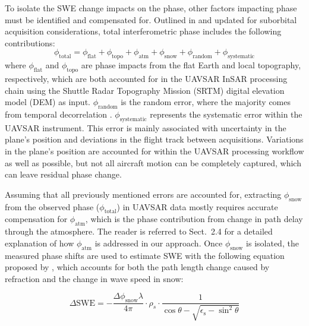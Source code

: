 To isolate the SWE change impacts on the phase, other factors impacting phase must be identified and compensated for. Outlined in \citet{deebMonitoringSnowpackEvolution2011} and updated for suborbital acquisition considerations, total interferometric phase includes the following contributions:
\begin{equation}
\phi_\mathrm{total} =  \phi_\mathrm{flat} + \phi_\mathrm{topo} + \phi_\mathrm{atm} + \phi_{\mathrm{snow}} + \phi_\mathrm{random} +\phi_\mathrm{systematic}
\end{equation}
where $\phi_\mathrm{flat}$ and $\phi_\mathrm{topo}$ are phase impacts from the flat Earth and local topography, respectively, which are both accounted for in the UAVSAR InSAR processing chain using the Shuttle Radar Topography Mission (SRTM) digital elevation model (DEM) as input. $\phi_\mathrm{random}$ is the random error, where the majority comes from temporal decorrelation \citep{zebkerAtmosphericEffectsInterferometric1997}. $\phi_\mathrm{systematic}$ represents the systematic error within the UAVSAR instrument. This error is mainly associated with uncertainty in the plane's position and deviations in the flight track between acquisitions. Variations in the plane's position are accounted for within the UAVSAR processing workflow as well as possible, but not all aircraft motion can be completely captured, which can leave residual phase change.

Assuming that all previously mentioned errors are accounted for, extracting $\phi_\mathrm{snow}$ from the observed phase ($\phi_\mathrm{total}$) in UAVSAR data mostly requires accurate compensation for $\phi_\mathrm{atm}$, which is the phase contribution from change in path delay through the atmosphere. The reader is referred to Sect.~2.4 for a detailed explanation of how $\phi_{\mathrm{atm}}$ is addressed in our approach. Once $\phi_\mathrm{snow}$ is isolated, the measured phase shifts are used to estimate SWE with the following equation proposed by \citet{guneriussenInSAREstimationChanges2001}, which accounts for both the path length change caused by refraction and the change in wave speed in snow:

\begin{equation}
\Delta\text{SWE} = - \frac{\Delta \phi_\mathrm{snow} \lambda}{4 \pi} \cdot \rho_{s} \cdot \frac{1}{\cos \theta- \sqrt{\epsilon_\mathrm{s} - \sin^{2} \theta}}
\label{eq:insar_dswe}
\end{equation}

